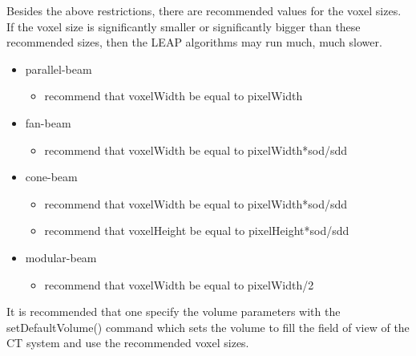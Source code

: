 \documentclass[11pt]{article}
\begin{document}
Besides the above restrictions, there are recommended values for the voxel sizes.  If the voxel size is significantly smaller or significantly bigger than these recommended sizes, then the LEAP algorithms may run much, much slower.

\begin{itemize}
\item parallel-beam
    \begin{itemize}
    \item recommend that voxelWidth be equal to pixelWidth
    \end{itemize}
\item fan-beam
    \begin{itemize}
    \item recommend that voxelWidth be equal to pixelWidth*sod/sdd
    \end{itemize}
\item cone-beam
    \begin{itemize}
    \item recommend that voxelWidth be equal to pixelWidth*sod/sdd
    \item recommend that voxelHeight be equal to pixelHeight*sod/sdd
    \end{itemize}
\item modular-beam
    \begin{itemize}
    \item recommend that voxelWidth be equal to pixelWidth/2
    \end{itemize}
\end{itemize}

It is recommended that one specify the volume parameters with the setDefaultVolume() command which sets the volume to fill the field of view of the CT system and use the recommended voxel sizes.
\end{document}
